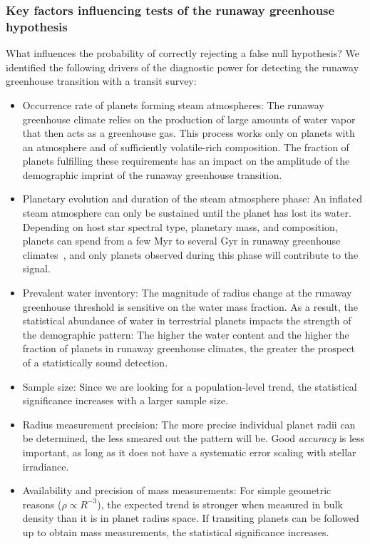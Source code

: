 \documentclass[modern]{aastex631}
\begin{document}
\subsubsection{Key factors influencing tests of the runaway greenhouse hypothesis}
What influences the probability of correctly rejecting a false null hypothesis?
We identified the following drivers of the diagnostic power for detecting the runaway greenhouse transition with a transit survey:
\begin{itemize}
    \item Occurrence rate of planets forming steam atmospheres: The runaway greenhouse climate relies on the production of large amounts of water vapor that then acts as a greenhouse gas. This process works only on planets with an atmosphere and of sufficiently volatile-rich composition. The fraction of planets fulfilling these requirements has an impact on the amplitude of the demographic imprint of the runaway greenhouse transition.
    \item Planetary evolution and duration of the steam atmosphere phase: An inflated steam atmosphere can only be sustained until the planet has lost its water. Depending on host star spectral type, planetary mass, and composition, planets can spend from a few Myr to several Gyr in runaway greenhouse climates~\citep[][]{Hamano2015,Luger2015}, and only planets observed during this phase will contribute to the signal.
    \item Prevalent water inventory: The magnitude of radius change at the runaway greenhouse threshold is sensitive on the water mass fraction. As a result, the statistical abundance of water in terrestrial planets impacts the strength of the demographic pattern:
        The higher the water content and the higher the fraction of planets in runaway greenhouse climates, the greater the prospect of a statistically sound detection.
    \item Sample size: Since we are looking for a population-level trend, the statistical significance increases with a larger sample size.
    \item Radius measurement precision: The more precise individual planet radii can be determined, the less smeared out the pattern will be. Good \textit{accuracy} is less important, as long as it does not have a systematic error scaling with stellar irradiance.
    \item Availability and precision of mass measurements: For simple geometric reasons ($\rho \propto R^{-3}$), the expected trend is stronger when measured in bulk density than it is in planet radius space. If transiting planets can be followed up to obtain mass measurements, the statistical significance increases.
\end{itemize}
\end{document}
